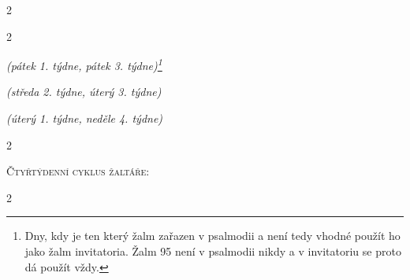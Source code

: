 \documentclass[a5paper, twoside]{article}
\newenvironment{hora}{
  \begin{multicols}{2}
}{
  \end{multicols}
}
\newcommand{\poznamkaPod}[1]{
  \hfill {\footnotesize \noindent \textit{#1}}}
\begin{document}
\begin{hora}
\label{benedictus}

\columnbreak
\label{magnificat}


\end{hora}

\vfill
\pagebreak


\begin{hora}
\label{zalm95}




\poznamkaPod{(pátek 1. týdne, pátek 3. týdne)\footnote{
Dny, kdy je ten který žalm zařazen v psalmodii a není tedy vhodné použít ho
jako žalm invitatoria. Žalm 95 není v psalmodii nikdy a v invitatoriu se proto
dá použít vždy.}}



\poznamkaPod{(středa 2. týdne, úterý 3. týdne)}

\label{z24}


\poznamkaPod{(úterý 1. týdne, neděle 4. týdne)}

\end{hora}


\begin{hora}



\end{hora}

\clearpage

\begin{center}
{\LARGE \textsc{Čtyřtýdenní cyklus žaltáře:}}
\end{center}



\nesporyI
\begin{hora}


\label{kantfp2}

\end{hora}
\end{document}
